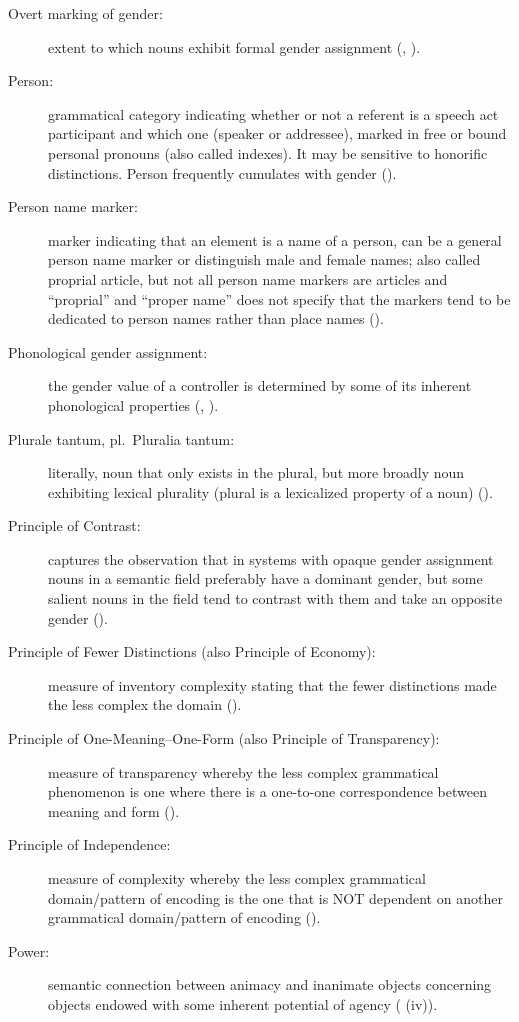 \documentclass[output=collectionpaper]{langsci/langscibook}
\begin{document}
{\begin{description}
\item  [Overt marking of gender:] extent to which nouns exhibit formal gender assignment (, ).
\item  [Person:] grammatical category indicating whether or not a referent is a speech act participant and which one (speaker or addressee), marked in free or bound personal pronouns (also called indexes). It may be sensitive to honorific distinctions. Person frequently cumulates with gender ().
\item  [Person name marker:] marker indicating that an element is a name of a person, can be a general person name marker or distinguish male and female names; also called proprial article, but not all person name markers are articles and “proprial” and “proper name” does not specify that the markers tend to be dedicated to person names rather than place names ().
\item  [Phonological gender assignment:] the gender value of a controller is determined by some of its inherent phonological properties (, ).
\item  [Plurale tantum, {\normalfont pl.}\ Pluralia tantum:] literally, noun that only exists in the plural, but more broadly noun exhibiting lexical plurality (plural is a lexicalized property of a noun) ().
\item  [Principle of Contrast:] captures the observation that in systems with opaque gender assignment nouns in a semantic field preferably have a dominant gender, but some salient nouns in the field tend to contrast with them and take an opposite gender ().
\item  [Principle of Fewer Distinctions (also Principle of Economy):] measure of inventory complexity stating that the fewer distinctions made the less complex the domain ().
\item  [Principle of One-Meaning–One-Form (also Principle of Transparency):] measure of transparency whereby the less complex grammatical phenomenon is one where there is a one-to-one correspondence between meaning and form ().
\item  [Principle of Independence:] measure of complexity whereby the less complex grammatical domain/pattern of encoding is the one that is NOT dependent on another grammatical domain/pattern of encoding ().
\item  [Power:] semantic connection between animacy and inanimate objects concerning objects endowed with some inherent potential of agency ( (iv)).

\end{description}}
\end{document}
